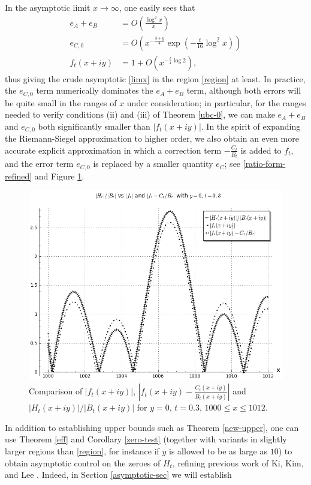 In the asymptotic limit $x \to \infty$, one easily sees that 
\begin{align*}
e_A+e_B &= O\left( \frac{\log^2 x}{x} \right)\\
e_{C,0} &= O\left( x^{-\frac{3+y}{4}} \exp\left(-\frac{t}{16} \log^2 x \right) \right)\\
f_t(x+iy) &= 1 + O\left( x^{-\frac{t}{4}\log 2} \right),
\end{align*}
thus giving the crude asymptotic \eqref{limx} in the region \eqref{region} at least.   In practice, the $e_{C,0}$ term numerically dominates the $e_A+e_B$ term, although both errors will be quite small in the ranges of $x$ under consideration; in particular, for the ranges needed to verify conditions (ii) and (iii) of Theorem \ref{ubc-0}, we can make $e_A+e_B$ and $e_{C,0}$ both significantly smaller than $|f_t(x+iy)|$.  In the spirit of expanding the Riemann-Siegel approximation to higher order, we also obtain an even more accurate explicit approximation in which a correction term $-\frac{C_t}{B_t}$ is added to $f_t$, and the error term $e_{C,0}$ is replaced by a smaller quantity $e_C$; see \eqref{ratio-form-refined} and Figure \ref{htft-c}.

\begin{figure}[h!]
  \includegraphics[width=0.6\linewidth]{Extra_RS_term.png}
  \caption{Comparison of $|f_t(x+iy)|$, $|f_t(x+iy)-\frac{C_t(x+iy)}{B_t(x+iy)}|$ and $|H_t(x+iy)|/|B_t(x+iy)|$ for $y=0$, $t=0.3$, $1000 \leq x \leq 1012$.}
	\label{htft-c}
\end{figure}

In addition to establishing upper bounds such as Theorem \ref{new-upper}, one can use Theorem \ref{eff} and Corollary \ref{zero-test} (together with variants in slightly larger regions than \eqref{region}, for instance if $y$ is allowed to be as large as $10$) to obtain asymptotic control on the zeroes of $H_t$, refining previous work of Ki, Kim, and Lee \cite{kkl}.  Indeed, in Section \ref{asymptotic-sec} we will establish

